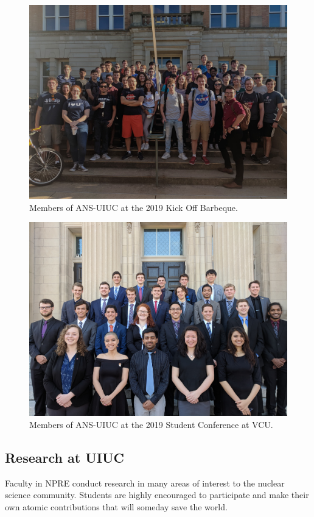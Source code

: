 \documentclass[11pt, letterpaper]{article}
\begin{document}
\begin{figure}[H]
  \centering
  \includegraphics[width=12cm]{ans_uiuc_group.jpg}
  \caption{Members of ANS-UIUC at the 2019 Kick Off Barbeque.}
\end{figure}

\begin{figure}[H]
  \centering
  \includegraphics[width=12cm]{ans_conf_19.jpg}
  \caption{Members of ANS-UIUC at the 2019 Student Conference at VCU.}
\end{figure}

\subsection{Research at UIUC}
Faculty in NPRE conduct research in many areas of interest to the nuclear science community. Students are highly encouraged to participate and make their own atomic contributions that will someday save the world.
\end{document}
